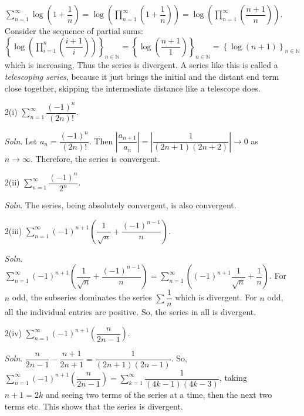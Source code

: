 \documentclass[a4paper,11pt]{article}
\newcommand{\lb}{\left(}
\newcommand{\rb}{\right)}
\newcommand{\lc}{\left\lbrace}
\newcommand{\rc}{\right\rbrace}
\renewcommand{\la}{\left|}
\renewcommand{\ra}{\right|}
\newcommand{\naturals}{\mathbb{N}}
\newcommand{\tends}{\rightarrow}
\newcommand{\dsum}{\displaystyle\sum}
\newcommand{\dprod}{\displaystyle\prod}
\begin{document}
\begin{itemize}
 $\dsum_{n=1}^\infty\log\lb 1+ \dfrac{1}{n}\rb=\log\lb\dprod_{n=1}^\infty \lb 1+ \dfrac{1}{n}\rb\rb=\log\lb\dprod_{n=1}^\infty \lb\dfrac{n+1}{n}\rb\rb$. Consider the sequence of partial sums: $\lc\log\lb\dprod_{i=1}^n \lb\dfrac{i+1}{i}\rb\rb\rc_{n\in\naturals}=\lc\log\lb\dfrac{n+1}{1}\rb\rc_{n\in\naturals}=\lc\log\lb n+1\rb\rc_{n\in\naturals}$ which is increasing. Thus the series is divergent. A series like this is called a \emph{telescoping series}, because it just brings the initial and the distant end term close together, skipping the intermediate distance like a telescope does.
  \item[]
    \item[2(i)]$\dsum_{n=1}^\infty\dfrac{(-1)^n}{(2n)!}$.
  \item[\textit{Soln}.]Let $a_n=\dfrac{(-1)^n}{(2n)!}$. Then $\la\dfrac{a_{n+1}}{a_n}\ra=\la\dfrac{1}{(2n+1)(2n+2)}\ra\tends 0$ as $n\tends\infty$. Therefore, the series is convergent.
  \item[]
    \item[2(ii)]$\dsum_{n=1}^\infty\dfrac{(-1)^n}{2^n}$.
  \item[\textit{Soln}.]The series, being absolutely convergent, is also convergent.
  \item[]
    \item[2(iii)]$\dsum_{n=1}^\infty(-1)^{n+1}\lb\dfrac{1}{\sqrt{n}}+\dfrac{(-1)^{n-1}}{n}\rb$.
  \item[\textit{Soln}.]$\dsum_{n=1}^\infty(-1)^{n+1}\lb\dfrac{1}{\sqrt{n}}+\dfrac{(-1)^{n-1}}{n}\rb=\dsum_{n=1}^\infty\lb(-1)^{n+1}\dfrac{1}{\sqrt{n}}+\dfrac{1}{n}\rb$. For $n$ odd, the subseries dominates the series $\dsum\dfrac{1}{n}$ which is divergent. For $n$ odd, all the individual entries are positive. So, the series in all is divergent.
  \item[]
    \item[2(iv)]$\dsum_{n=1}^\infty(-1)^{n+1}\lb\dfrac{n}{2n-1}\rb$.
  \item[\textit{Soln}.]$\dfrac{n}{2n-1}-\dfrac{n+1}{2n+1}=\dfrac{1}{\lb 2n+1\rb\lb 2n-1\rb}$. So, $\dsum_{n=1}^\infty(-1)^{n+1}\lb\dfrac{n}{2n-1}\rb=\dsum_{k=1}^\infty\dfrac{1}{(4k-1)(4k-3)}$, taking $n+1=2k$ and seeing two terms of the series at a time, then the next two terms etc. This shows that the series is divergent.
  
\end{itemize}
\end{document}
